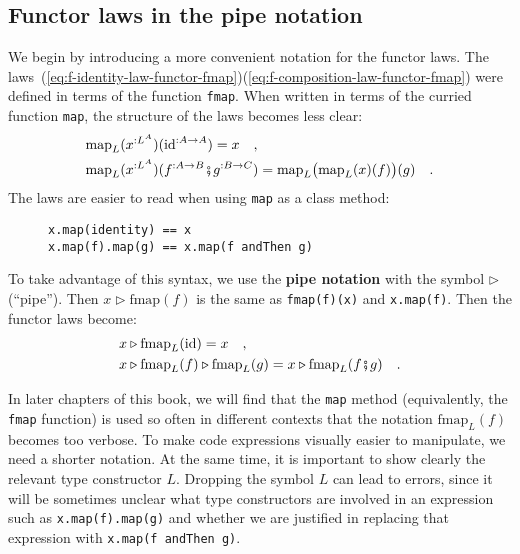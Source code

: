 \subsection{Functor laws in the pipe notation}

We begin by introducing a more convenient notation for the functor
laws. The laws~(\ref{eq:f-identity-law-functor-fmap})\textendash (\ref{eq:f-composition-law-functor-fmap})
were defined in terms of the function \lstinline!fmap!. When written
in terms of the curried function \lstinline!map!, the structure of
the laws becomes less clear:
\begin{align*}
 & \text{map}_{L}(x^{:L^{A}})(\text{id}^{:A\rightarrow A})=x\quad,\\
 & \text{map}_{L}(x^{:L^{A}})(f^{:A\rightarrow B}\bef g^{:B\rightarrow C})=\text{map}_{L}\big(\text{map}_{L}(x)(f)\big)(g)\quad.
\end{align*}
The laws are easier to read when using \lstinline!map! as a class
method:

\begin{wrapfigure}{l}{0.379\columnwidth}%
\vspace{-0.8\baselineskip}
\begin{lstlisting}
x.map(identity) == x
x.map(f).map(g) == x.map(f andThen g)
\end{lstlisting}

\vspace{-0.5\baselineskip}
\end{wrapfigure}%

\noindent To take advantage of this syntax, we use the \textbf{pipe
notation} with the symbol $\triangleright$ (\textsf{``}pipe\textsf{''}). Then $x\triangleright\text{fmap}(f)$
is the same as \lstinline!fmap(f)(x)! and \lstinline!x.map(f)!.
Then the functor laws become:
\begin{align*}
 & x\triangleright\text{fmap}_{L}(\text{id})=x\quad,\\
 & x\triangleright\text{fmap}_{L}(f)\triangleright\text{fmap}_{L}(g)=x\triangleright\text{fmap}_{L}(f\bef g)\quad.
\end{align*}

In later chapters of this book, we will find that the \lstinline!map!
method (equivalently, the \lstinline!fmap! function) is used so often
in different contexts that the notation $\text{fmap}_{L}(f)$ becomes
too verbose. To make code expressions visually easier to manipulate,
we need a shorter notation. At the same time, it is important to show
clearly the relevant type constructor $L$. Dropping the symbol $L$
can lead to errors, since it will be sometimes unclear what type constructors
are involved in an expression such as \lstinline!x.map(f).map(g)!
and whether we are justified in replacing that expression with \lstinline!x.map(f andThen g)!.


